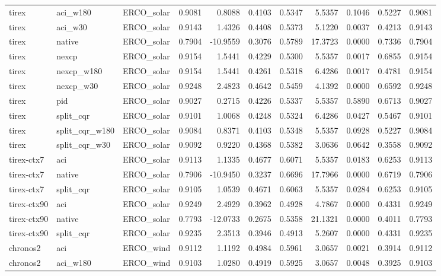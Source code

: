 \begin{tabular}{lllrrrrrrrr}
tirex & aci_w180 & ERCO_solar & 0.9081 & 0.8088 & 0.4103 & 0.5347 & 5.5357 & 0.1046 & 0.5227 & 0.9081 \\
tirex & aci_w30 & ERCO_solar & 0.9143 & 1.4326 & 0.4408 & 0.5373 & 5.1220 & 0.0037 & 0.4213 & 0.9143 \\
tirex & native & ERCO_solar & 0.7904 & -10.9559 & 0.3076 & 0.5789 & 17.3723 & 0.0000 & 0.7336 & 0.7904 \\
tirex & nexcp & ERCO_solar & 0.9154 & 1.5441 & 0.4229 & 0.5300 & 5.5357 & 0.0017 & 0.6855 & 0.9154 \\
tirex & nexcp_w180 & ERCO_solar & 0.9154 & 1.5441 & 0.4261 & 0.5318 & 6.4286 & 0.0017 & 0.4781 & 0.9154 \\
tirex & nexcp_w30 & ERCO_solar & 0.9248 & 2.4823 & 0.4642 & 0.5459 & 4.1392 & 0.0000 & 0.6592 & 0.9248 \\
tirex & pid & ERCO_solar & 0.9027 & 0.2715 & 0.4226 & 0.5337 & 5.5357 & 0.5890 & 0.6713 & 0.9027 \\
tirex & split_cqr & ERCO_solar & 0.9101 & 1.0068 & 0.4248 & 0.5324 & 6.4286 & 0.0427 & 0.5467 & 0.9101 \\
tirex & split_cqr_w180 & ERCO_solar & 0.9084 & 0.8371 & 0.4103 & 0.5348 & 5.5357 & 0.0928 & 0.5227 & 0.9084 \\
tirex & split_cqr_w30 & ERCO_solar & 0.9092 & 0.9220 & 0.4368 & 0.5382 & 3.0636 & 0.0642 & 0.3558 & 0.9092 \\
tirex-ctx7 & aci & ERCO_solar & 0.9113 & 1.1335 & 0.4677 & 0.6071 & 5.5357 & 0.0183 & 0.6253 & 0.9113 \\
tirex-ctx7 & native & ERCO_solar & 0.7906 & -10.9450 & 0.3237 & 0.6696 & 17.7966 & 0.0000 & 0.6719 & 0.7906 \\
tirex-ctx7 & split_cqr & ERCO_solar & 0.9105 & 1.0539 & 0.4671 & 0.6063 & 5.5357 & 0.0284 & 0.6253 & 0.9105 \\
tirex-ctx90 & aci & ERCO_solar & 0.9249 & 2.4929 & 0.3962 & 0.4928 & 4.7867 & 0.0000 & 0.4331 & 0.9249 \\
tirex-ctx90 & native & ERCO_solar & 0.7793 & -12.0733 & 0.2675 & 0.5358 & 21.1321 & 0.0000 & 0.4011 & 0.7793 \\
tirex-ctx90 & split_cqr & ERCO_solar & 0.9235 & 2.3513 & 0.3946 & 0.4913 & 5.2607 & 0.0000 & 0.4331 & 0.9235 \\
chronos2 & aci & ERCO_wind & 0.9112 & 1.1192 & 0.4984 & 0.5961 & 3.0657 & 0.0021 & 0.3914 & 0.9112 \\
chronos2 & aci_w180 & ERCO_wind & 0.9103 & 1.0280 & 0.4919 & 0.5925 & 3.0657 & 0.0048 & 0.3925 & 0.9103 \\

\end{tabular}
